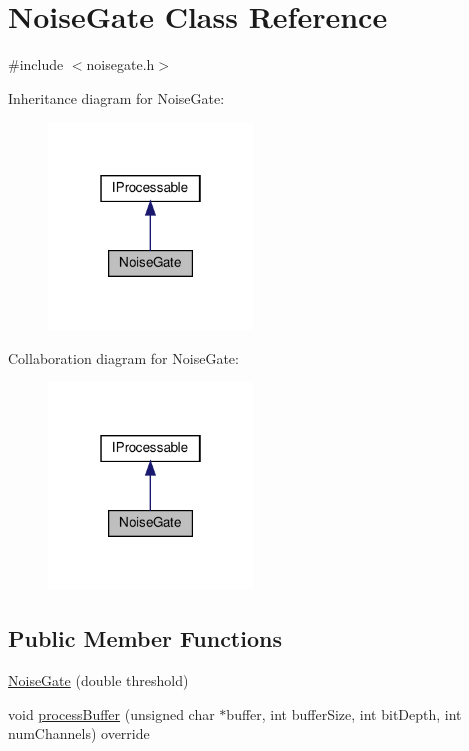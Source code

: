 \hypertarget{classNoiseGate}{}\section{Noise\+Gate Class Reference}
\label{classNoiseGate}


{\ttfamily \#include $<$noisegate.\+h$>$}



Inheritance diagram for Noise\+Gate\+:\nopagebreak
\begin{figure}[H]
\begin{center}
\leavevmode
\includegraphics[width=154pt]{d5/d39/classNoiseGate__inherit__graph}
\end{center}
\end{figure}


Collaboration diagram for Noise\+Gate\+:\nopagebreak
\begin{figure}[H]
\begin{center}
\leavevmode
\includegraphics[width=154pt]{d8/da9/classNoiseGate__coll__graph}
\end{center}
\end{figure}
\subsection*{Public Member Functions}
\begin{DoxyCompactItemize}
\item 
\hyperlink{classNoiseGate_a5106cfbd673a9ba6faf5f283a92ebf93}{Noise\+Gate} (double threshold)
\item 
void \hyperlink{classNoiseGate_a7d58bdbe85f4e2709c77f5d3d5f34e09}{process\+Buffer} (unsigned char $\ast$buffer, int buffer\+Size, int bit\+Depth, int num\+Channels) override
\end{DoxyCompactItemize}


